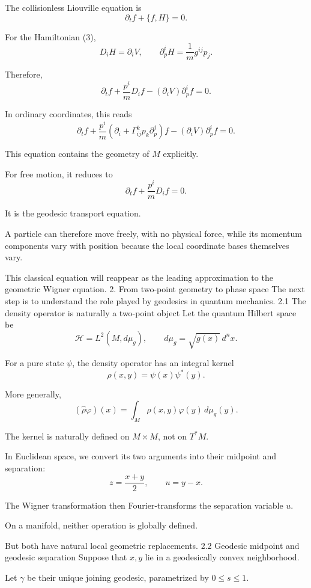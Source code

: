 The collisionless Liouville equation is
\[
\partial_t f+\{f,H\}=0.
\tag{14}
\]

For the Hamiltonian (3),
\[
D_iH=\partial_iV,\qquad
\partial_p^iH=\frac1m g^{ij}p_j.
\]

Therefore,
\[
\boxed{
\partial_t f+
\frac{p^i}{m}D_if
-
(\partial_iV)\partial_p^if=0.
}
\tag{15}
\]

In ordinary coordinates, this reads
\[
\partial_t f+
\frac{p^i}{m}
\left(
\partial_i+
\Gamma^k_{ij}p_k\partial_p^j
\right)f
-
(\partial_iV)\partial_p^if=0.
\tag{16}
\]

This equation contains the geometry of \(M\) explicitly.

For free motion, it reduces to
\[
\boxed{
\partial_t f+\frac{p^i}{m}D_if=0.
}
\tag{17}
\]

It is the geodesic transport equation.

A particle can therefore move freely, with no physical force, while its momentum components vary with position because the local coordinate bases themselves vary.

This classical equation will reappear as the leading approximation to the geometric Wigner equation.
2. From two-point geometry to phase space
The next step is to understand the role played by geodesics in quantum mechanics.
2.1 The density operator is naturally a two-point object
Let the quantum Hilbert space be
\[
\mathcal H=L^2(M,d\mu_g),
\qquad
d\mu_g=\sqrt{g(x)}\,d^nx.
\tag{18}
\]

For a pure state \(\psi\), the density operator has an integral kernel
\[
\rho(x,y)=\psi(x)\psi^*(y).
\tag{19}
\]

More generally,
\[
(\widehat\rho\varphi)(x)
=
\int_M\rho(x,y)\varphi(y)\,d\mu_g(y).
\]

The kernel is naturally defined on \(M\times M\), not on \(T^*M\).

In Euclidean space, we convert its two arguments into their midpoint and separation:
\[
z=\frac{x+y}{2},\qquad u=y-x.
\tag{20}
\]

The Wigner transformation then Fourier-transforms the separation variable \(u\).

On a manifold, neither operation is globally defined.

But both have natural local geometric replacements.
2.2 Geodesic midpoint and geodesic separation
Suppose that \(x,y\) lie in a geodesically convex neighborhood.

Let \(\gamma\) be their unique joining geodesic, parametrized by \(0\le s\le1\).

